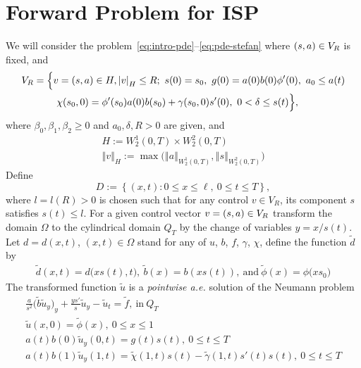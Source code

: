 \documentclass[letterpaper, 10pt]{amsart}
\theoremstyle{definition}
\theoremstyle{remark}
\newcommand{\bk}[1]{\left\{#1\right\}}
\newcommand{\norm}[1]{\left\Vert #1\right\Vert}%
\newcommand{\lnorm}[1]{\left\vert #1\right\vert}%
\begin{document}
\section{Forward Problem for ISP}\label{sec:forward-problem}
We will consider the problem~\eqref{eq:intro-pde}--\eqref{eq:pde-stefan} where $(s, a{}) \in V_R$ is fixed, and
\begin{align}
  V_R & =\Big\{
        v=(\controlvars{}) \in H, \lnorm{v}_H \leq R;
        ~s(0) = s_0,
        ~g(0) = a(0)b(0) \phi'(0),
        ~a_0 \leq a(t)\nonumber
  \\
      & \qquad
        ~\chi(s_{0},0) = \phi'(s_{0})a(0)b(s_0) + \gamma(s_0, 0)s'(0),
        ~0 < \delta \leq s(t)
        \Big\},\label{eq:control-set}
\end{align}
where $\beta_0, \beta_1, \beta_2 \geq 0$ and $a_0, \delta, R > 0$ are given, and
\def\acontrolspace{W_2^1}
\def\scontrolspace{W_2^2}
\begin{gather*}
  H := \acontrolspace(0,T)
  \times \scontrolspace(0,T)
    \\
    \norm{v}_H := \max\Big(
    \norm{a}_{\acontrolspace(0,T)},
    \norm{s}_{\scontrolspace(0,T)}
    \Big)
  \end{gather*}
  Define
  \let\l\ell%
\[
  D := \bk{(x,t) : 0\leq x\leq \l,~ 0\leq t\leq T},
\]
where $l = l(R) > 0$ is chosen such that for any control $v\in V_R$, its component
$s$ satisfies $s(t)\leq l$.
For a given control vector $v = (s, a{}) \in V_R$ transform the domain $\Omega$ to the cylindrical domain $Q_T$
by the change of variables $y = x / s(t)$.
Let $d = d(x, t)$, $(x, t) \in \Omega$ stand for any of $u$, $b$, $f$, $\gamma$, $\chi$, define the function $\tilde{d}$ by
\begin{gather*}
  \tilde{d}(x,t) = d\big(x s(t), t\big),~
  \tilde{b}(x) = b(x s(t)),~\text{and}~
  \tilde{\phi}(x) = \phi\big( x s_0\big)
\end{gather*}
\def\utilde{\tilde{u}}
The transformed function $\utilde$ is a \emph{pointwise a.e.} solution of the Neumann problem
\begin{gather}
  \frac{a}{s^2}\big(\tilde{b} \utilde_y\big)_y + \frac{y s'}{s} \utilde_y - \utilde_{t} = \tilde{f}, ~\text{in}~Q_T\label{eq:tform-pde}
  \\
  \utilde(x,0) = \tilde{\phi}(x), ~0 \leq x \leq 1 \label{eq:tform-iv}
  \\
  a(t) b(0) \utilde_y(0, t) = g(t)s(t), ~0 \leq t \leq T   \label{eq:tform-lbdy}
  \\
  a(t) b(1) \utilde_y(1, t) = \tilde{\chi}(1, t) s(t) - \tilde{\gamma}(1,t)s'(t)s(t), ~0 \leq t \leq T \label{eq:tform-rbdy}
\end{gather}
\end{document}
